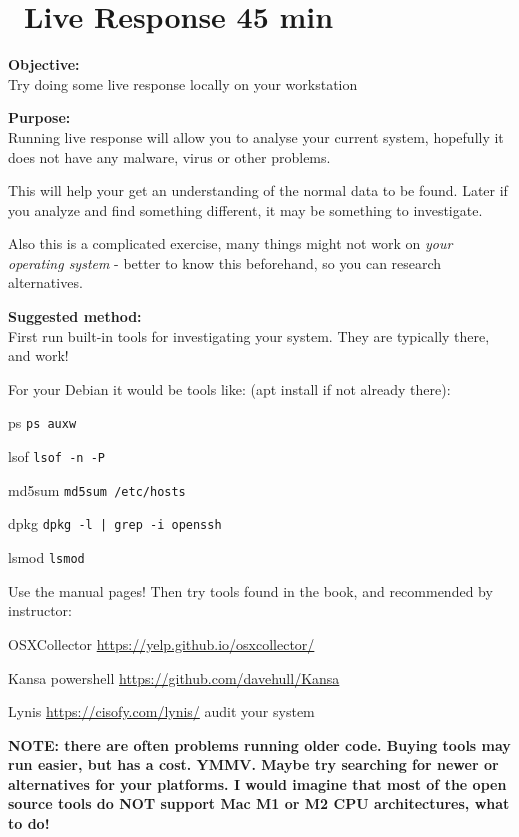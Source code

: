 \documentclass[a4paper,11pt,notitlepage]{report}
\begin{document}
\chapter{\faExclamationTriangle\ Live Response 45 min}
\label{ex:live-response}

{\bf Objective:}\\
Try doing some live response locally on your workstation


{\bf Purpose:}\\
Running live response will allow you to analyse your current system, hopefully it does not have any malware, virus or other problems.

This will help your get an understanding of the normal data to be found. Later if you analyze and find something different, it may be something to investigate.

Also this is a complicated exercise, many things might not work on \emph{your operating system} - better to know this beforehand, so you can research alternatives.

{\bf Suggested method:}\\
First run built-in tools for investigating your system. They are typically there, and work!

For your Debian it would be tools like: (apt install if not already there):

\begin{list2}
\item ps \verb+ps auxw+
\item lsof \verb+lsof -n -P+
\item md5sum \verb+md5sum /etc/hosts+
\item dpkg \verb+dpkg -l | grep -i openssh+
\item lsmod \verb+lsmod+
\end{list2}

Use the manual pages! Then try tools found in the book, and recommended by instructor:
\begin{list2}
\item OSXCollector \url{https://yelp.github.io/osxcollector/}
\item Kansa powershell \url{https://github.com/davehull/Kansa}
\item Lynis \url{https://cisofy.com/lynis/} audit your system
\end{list2}

{\bf NOTE: there are often problems running older code. Buying tools may run easier, but has a cost. YMMV. Maybe try searching for newer or alternatives for your platforms. I would imagine that most of the open source tools do NOT support Mac M1 or M2 CPU architectures, what to do!}
\end{document}

